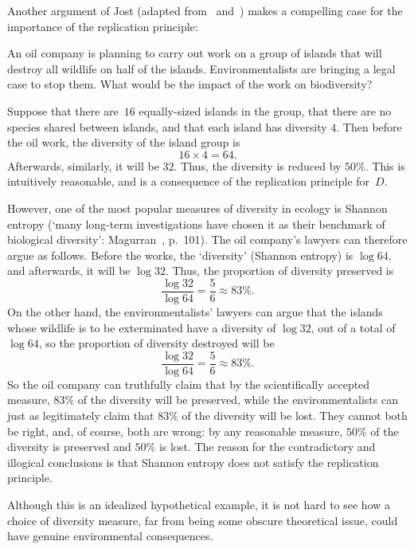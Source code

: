 Another argument of Jost%
%
%
(adapted from~\cite{JostMBD} and~\cite{JDWG}) makes a compelling case for
the importance of the replication principle:

\begin{example}
%
%
% 
 An oil company is planning to carry out work on a group of
islands that will destroy all wildlife on half of the islands.%
%
% 
Environmentalists are bringing a legal case to stop them.  What would be
the impact of the work on biodiversity?

Suppose that there are~$16$ equally-sized islands in the group, that there
are no species shared between islands, and that each island has diversity
$4$.  Then before the oil work, the diversity of the island group is
\[
16 \times 4 = 64.
\]
Afterwards, similarly, it will be $32$.  Thus, the diversity is reduced by
$50\%$.  This is intuitively reasonable, and is a consequence of the
replication principle for~$D$.

However, one of the most popular measures of diversity in ecology is
Shannon entropy (`many long-term investigations have chosen it as their
benchmark of biological diversity': Magurran~\cite{Magu},%
% 
% 
p.~101).  The oil company's lawyers can therefore argue as follows.  Before
the works, the `diversity' (Shannon entropy) is $\log 64$, and afterwards,
it will be $\log 32$.  Thus, the proportion of diversity preserved is
\[
\frac{\log 32}{\log 64} 
=
\frac{5}{6} 
\approx
83\%.
\]
On the other hand, the environmentalists' lawyers can argue that the
islands whose wildlife is to be exterminated have a diversity of $\log
32$, out of a total of $\log 64$, so the proportion of diversity destroyed
will be 
\[
\frac{\log 32}{\log 64}
=
\frac{5}{6}
\approx 
83\%.
\]
So the oil company can truthfully claim that by the scientifically accepted
measure, $83\%$ of the diversity will be preserved, while the
environmentalists can just as legitimately claim that $83\%$ of the
diversity will be lost.  They cannot both be right, and, of course, both
are wrong: by any reasonable measure, $50\%$ of the diversity is preserved
and $50\%$ is lost.  The reason for the contradictory and illogical
conclusions is that Shannon entropy does not satisfy the replication
principle. 

Although this is an idealized hypothetical example, it is not hard to
see how a choice of diversity measure, far from being some obscure
theoretical issue, could have genuine environmental consequences.
\end{example}

